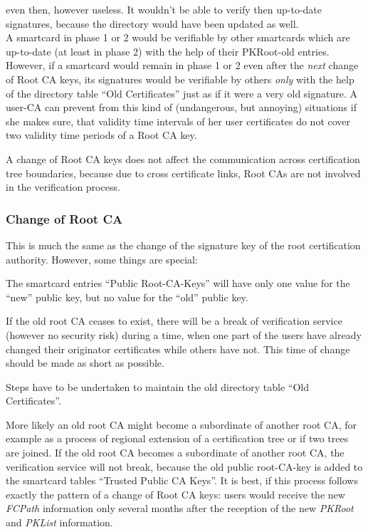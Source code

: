 even then, however useless.
It wouldn't be able to verify then up-to-date signatures,
because the directory would have been updated as well.
\\[1ex]
A smartcard in phase 1 or 2 would be verifiable by other smartcards
which are up-to-date (at least in phase 2)
with the help of their PKRoot-old entries.
However, if a smartcard would remain in phase 1 or 2 even after the {\em next}
change of Root CA keys,
its signatures would be verifiable by others
{\em only} with the help of the directory table ``Old Certificates''
just as if it were a very old signature.
A user-CA can prevent from this kind of
(undangerous, but annoying) situations
if she makes sure, that validity time intervals of her user certificates
do not cover two validity time periods of a Root CA key.

A change of Root CA keys does not affect the communication
across certification tree boundaries,
because due to cross certificate links, Root CAs are not involved
in the verification process.

\subsubsection{Change of Root CA}
\label{ops-cr}

This is much the same as the change of the signature key of the root
certification authority. However, some things are special:

The smartcard entries ``Public Root-CA-Keys'' will have
only one value for the ``new'' public key, but no value
for the ``old'' public key.

If the old root CA ceases to exist, there will be a break of
verification service (however no security risk)
during a time, when one part of the users
have already changed their originator certificates while others have
not. This time of change should be made as short as possible.

Steps have to be undertaken to maintain the old directory
table ``Old Certificates''.

More likely an
old root CA might become a subordinate of another root CA,
for example as a process of regional extension of a certification tree
or if two trees are joined.
If the old root CA becomes a subordinate of another root CA,
the verification service will not break, because the old
public root-CA-key is added to the smartcard tables ``Trusted Public CA Keys''.
It is best, if
this process follows exactly the pattern of a change of Root CA keys:
users would receive the new {\em FCPath} information
only several months after the reception of the new
{\em PKRoot} and {\em PKList} information.

